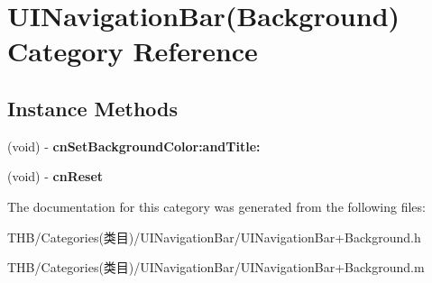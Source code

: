 \hypertarget{category_u_i_navigation_bar_07_background_08}{}\section{U\+I\+Navigation\+Bar(Background) Category Reference}
\label{category_u_i_navigation_bar_07_background_08}
\subsection*{Instance Methods}
\begin{DoxyCompactItemize}
\item 
\mbox{\label{category_u_i_navigation_bar_07_background_08_ab2f8701a5b80bb6c2f5593a60bc3f28d}} 
(void) -\/ {\bfseries cn\+Set\+Background\+Color\+:and\+Title\+:}
\item 
\mbox{\label{category_u_i_navigation_bar_07_background_08_a529f2abbae34a0b66ff4768042c3fde3}} 
(void) -\/ {\bfseries cn\+Reset}
\end{DoxyCompactItemize}


The documentation for this category was generated from the following files\+:\begin{DoxyCompactItemize}
\item 
T\+H\+B/\+Categories(类目)/\+U\+I\+Navigation\+Bar/U\+I\+Navigation\+Bar+\+Background.\+h\item 
T\+H\+B/\+Categories(类目)/\+U\+I\+Navigation\+Bar/U\+I\+Navigation\+Bar+\+Background.\+m\end{DoxyCompactItemize}

